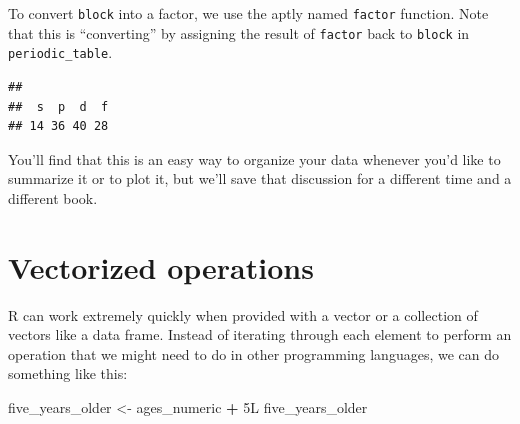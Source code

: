 \documentclass[]{tufte-book}
\newenvironment{Shaded}{\begin{snugshade}}{\end{snugshade}}
\newcommand{\AttributeTok}[1]{\textcolor[rgb]{0.13,0.29,0.53}{#1}}
\newcommand{\DataTypeTok}[1]{\textcolor[rgb]{0.13,0.29,0.53}{#1}}
\newcommand{\DecValTok}[1]{\textcolor[rgb]{0.00,0.00,0.81}{#1}}
\newcommand{\FunctionTok}[1]{\textcolor[rgb]{0.13,0.29,0.53}{\textbf{#1}}}
\newcommand{\NormalTok}[1]{#1}
\newcommand{\OtherTok}[1]{\textcolor[rgb]{0.56,0.35,0.01}{#1}}
\newcommand{\SpecialCharTok}[1]{\textcolor[rgb]{0.81,0.36,0.00}{\textbf{#1}}}
\newcommand{\StringTok}[1]{\textcolor[rgb]{0.31,0.60,0.02}{#1}}
\begin{document}
To convert \texttt{block} into a factor, we use the aptly named \texttt{factor} function. Note that this is ``converting'' by assigning the result of \texttt{factor} back to \texttt{block} in \texttt{periodic\_table}.

\begin{Shaded}
\end{Shaded}

\begin{Shaded}
\end{Shaded}

\begin{verbatim}
## 
##  s  p  d  f 
## 14 36 40 28
\end{verbatim}

You'll find that this is an easy way to organize your data whenever you'd like to summarize it or to plot it, but we'll save that discussion for a different time and a different book.

\section{Vectorized operations}\label{vectorized-operations}

R can work extremely quickly when provided with a vector or a collection of vectors like a data frame. Instead of iterating through each element to perform an operation that we might need to do in other programming languages, we can do something like this:

\begin{Shaded}
\begin{Highlighting}[]
\NormalTok{five\_years\_older }\OtherTok{\textless{}{-}}\NormalTok{ ages\_numeric }\SpecialCharTok{+} \DecValTok{5}\DataTypeTok{L}
\NormalTok{five\_years\_older}
\end{Highlighting}
\end{Shaded}
\end{document}
